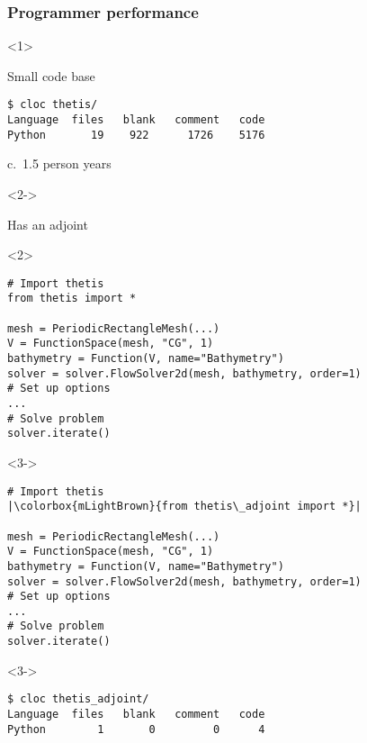 \documentclass{beamer}
\begin{document}
\begin{frame}[fragile]
  \frametitle{Programmer performance}
  \begin{onlyenv}<1>
    \begin{block}{Small code base}
\begin{verbatim}
$ cloc thetis/
Language  files   blank   comment   code
Python       19    922      1726    5176
\end{verbatim}
      c.~1.5 person years
    \end{block}
  \end{onlyenv}
  \begin{onlyenv}<2->
    \begin{block}{Has an adjoint}
      \begin{onlyenv}<2>
\begin{verbatim}
# Import thetis
from thetis import *

mesh = PeriodicRectangleMesh(...)
V = FunctionSpace(mesh, "CG", 1)
bathymetry = Function(V, name="Bathymetry")
solver = solver.FlowSolver2d(mesh, bathymetry, order=1)
# Set up options
...
# Solve problem
solver.iterate()
\end{verbatim}
      \end{onlyenv}
      \begin{onlyenv}<3->
\begin{verbatim}
# Import thetis
|\colorbox{mLightBrown}{from thetis\_adjoint import *}|

mesh = PeriodicRectangleMesh(...)
V = FunctionSpace(mesh, "CG", 1)
bathymetry = Function(V, name="Bathymetry")
solver = solver.FlowSolver2d(mesh, bathymetry, order=1)
# Set up options
...
# Solve problem
solver.iterate()
\end{verbatim}
      \end{onlyenv}
    \end{block}
    \begin{visibleenv}<3->
\begin{verbatim}
$ cloc thetis_adjoint/
Language  files   blank   comment   code
Python        1       0         0      4
\end{verbatim}
    \end{visibleenv}
  \end{onlyenv}
\end{frame}
\end{document}
